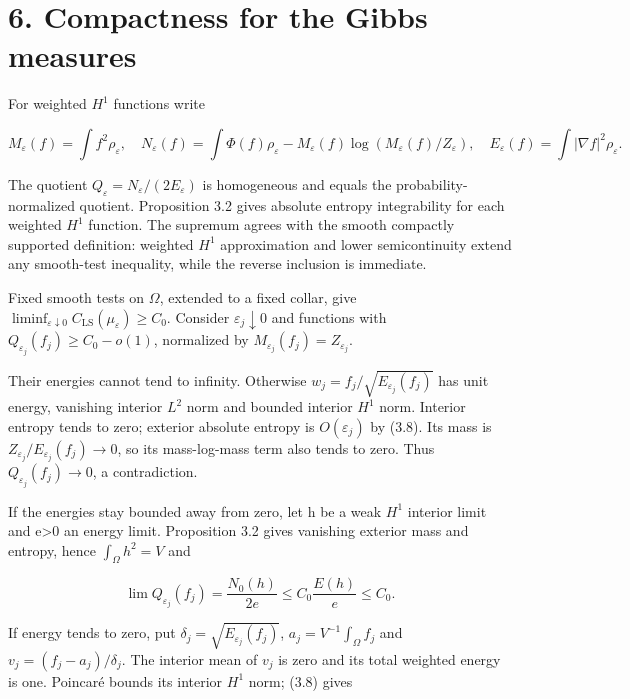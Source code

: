 \documentclass[11pt]{article}
\begin{document}
\section{6. Compactness for the Gibbs
measures}\label{compactness-for-the-gibbs-measures}

For weighted \(H^{1}\) functions write

\[M_\varepsilon(f)=\int f^2\rho_\varepsilon,\quad
N_\varepsilon(f)=\int\Phi(f)\rho_\varepsilon
-M_\varepsilon(f)\log(M_\varepsilon(f)/Z_\varepsilon),\quad
E_\varepsilon(f)=\int|\nabla f|^2\rho_\varepsilon.\tag{6.1}\]

The quotient \(Q_\varepsilon =N_\varepsilon /(2E_\varepsilon )\) is
homogeneous and equals the probability-normalized quotient. Proposition
3.2 gives absolute entropy integrability for each weighted \(H^{1}\)
function. The supremum agrees with the smooth compactly supported
definition: weighted \(H^{1}\) approximation and lower semicontinuity
extend any smooth-test inequality, while the reverse inclusion is
immediate.

Fixed smooth tests on \(\Omega\), extended to a fixed collar, give
\(\liminf_{\varepsilon\downarrow0}C_{\mathrm{LS}}(\mu_\varepsilon)\geq C_0\).
Consider \(\varepsilon _j\downarrow 0\) and functions with
\(Q_{\varepsilon _j}(f_j)\geq C_0-o(1)\), normalized by
\(M_{\varepsilon _j}(f_j)=Z_{\varepsilon _j}\).

Their energies cannot tend to infinity. Otherwise
\(w_j=f_j/\sqrt{E_{\varepsilon_j}(f_j)}\) has unit energy, vanishing
interior \(L^{2}\) norm and bounded interior \(H^{1}\) norm. Interior
entropy tends to zero; exterior absolute entropy is
\(O(\varepsilon _j)\) by (3.8). Its mass is
\(Z_{\varepsilon _j}/E_{\varepsilon _j}(f_j)\to 0\), so its
mass-log-mass term also tends to zero. Thus
\(Q_{\varepsilon _j}(f_j)\to 0\), a contradiction.

If the energies stay bounded away from zero, let h be a weak \(H^{1}\)
interior limit and e\textgreater0 an energy limit. Proposition 3.2 gives
vanishing exterior mass and entropy, hence \(\int _\Omega h^{2}=V\) and

\[\lim Q_{\varepsilon_j}(f_j)=\frac{N_0(h)}{2e}
\leq C_0\frac{E(h)}e\leq C_0.\tag{6.2}\]

If energy tends to zero, put
\(\delta _j=\sqrt{E_{\varepsilon_j}(f_j)}\),
\(a_j=V^{-1}\int _\Omega f_j\) and \(v_j=(f_j-a_j)/\delta _j\). The
interior mean of \(v_j\) is zero and its total weighted energy is one.
Poincaré bounds its interior \(H^{1}\) norm; (3.8) gives
\end{document}
